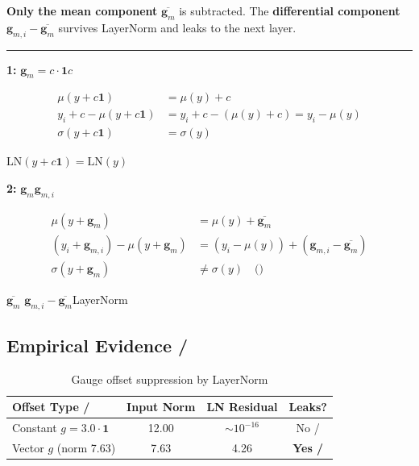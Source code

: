\documentclass[11pt,a4paper]{article}
\newcommand{\gauge}{\mathbf{g}}
\begin{document}
\textbf{Only the mean component} $\overline{\gauge_m}$ is subtracted.
The \textbf{differential component} $\gauge_{m,i} - \overline{\gauge_m}$
survives LayerNorm and leaks to the next layer.

\medskip
\noindent\rule{\textwidth}{0.5pt}

\medskip
\noindent\textbf{1: } $\gauge_m = c \cdot \mathbf{1}$$c$

\begin{align}
    \mu(y + c\mathbf{1}) &= \mu(y) + c \\
    y_i + c - \mu(y + c\mathbf{1}) &= y_i + c - (\mu(y) + c) = y_i - \mu(y) \\
    \sigma(y + c\mathbf{1}) &= \sigma(y)
\end{align}

$\text{LN}(y + c\mathbf{1}) = \text{LN}(y)$\textbf{}

\medskip
\noindent\textbf{2: } $\gauge_m$$\gauge_{m,i}$

\begin{align}
    \mu(y + \gauge_m) &= \mu(y) + \overline{\gauge_m} \\
    (y_i + \gauge_{m,i}) - \mu(y + \gauge_m) &= (y_i - \mu(y)) + (\gauge_{m,i} - \overline{\gauge_m}) \\
    \sigma(y + \gauge_m) &\neq \sigma(y) \quad \text{()}
\end{align}

\textbf{}$\overline{\gauge_m}$
\textbf{}$\gauge_{m,i} - \overline{\gauge_m}$LayerNorm

\subsection{Empirical Evidence / }

\begin{table}[h]
\centering
\caption{Gauge offset suppression by LayerNorm}
\begin{tabular}{@{}lccc@{}}
\toprule
\textbf{Offset Type / } & \textbf{Input Norm} & \textbf{LN Residual} & \textbf{Leaks?} \\
\midrule
Constant $g = 3.0 \cdot \mathbf{1}$ & 12.00 & ${\sim}10^{-16}$ & No /  \\
Vector $g$ (norm 7.63)            & 7.63  & 4.26            & \textbf{Yes / } \\
\bottomrule
\end{tabular}
\end{table}
\end{document}
